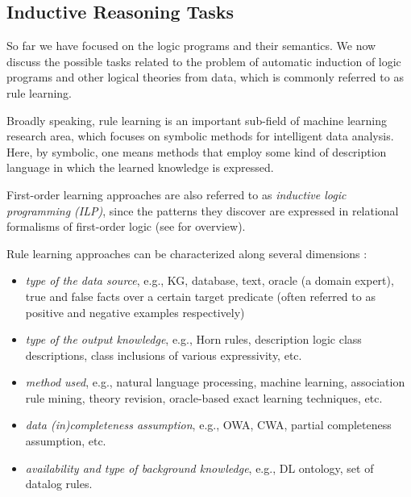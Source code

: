 \subsection{Inductive Reasoning Tasks}
\label{sec:rules_learning_tasks}

So far we have focused on the logic programs and their semantics. We now discuss the possible tasks related to the problem of automatic induction of logic programs and other logical theories from data, which is commonly referred to as rule learning. 

Broadly speaking, rule learning is an important sub-field of machine learning research area, which focuses on symbolic methods for intelligent data analysis. Here, by symbolic, one means methods that employ some kind of description language in which the learned knowledge is expressed. %

First-order learning approaches are also referred to as %
 \emph{inductive logic programming (ILP)}, since the patterns they discover are expressed in
relational formalisms of first-order logic (see \cite{DBLP:books/daglib/0021868} for overview).

Rule learning approaches can be characterized along several dimensions \cite{DBLP:conf/semweb/SazonauS17}: 
\begin{itemize}
\item \emph{type of the data source}, e.g., KG, database, text, oracle (a domain expert), true and false facts over a certain target predicate (often referred to as positive and negative examples respectively)
\item \emph{type of the output knowledge}, e.g., Horn rules, description logic class descriptions, class inclusions of various expressivity, etc.
\item \emph{method used}, e.g., natural language processing, machine learning, association rule mining, theory revision, oracle-based exact learning techniques, etc.
\item \emph{data (in)completeness assumption}, e.g., OWA, CWA, partial completeness assumption, etc.
\item \emph{availability and type of background knowledge}, e.g., DL ontology, set of datalog rules.
\end{itemize}

